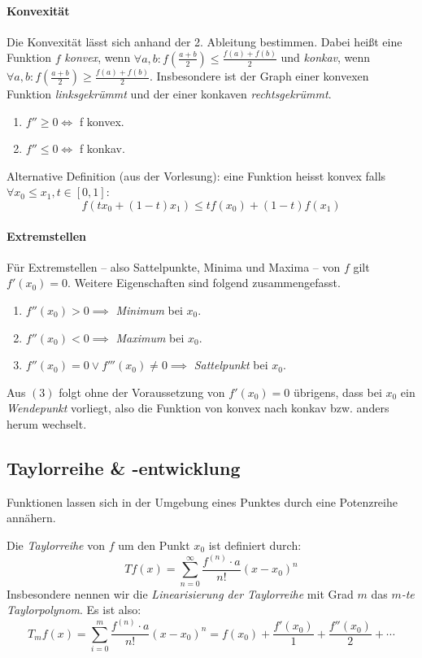 \documentclass[a4paper, 9pt, DIV=24]{scrartcl}
\begin{document}
\paragraph{Konvexität}
Die Konvexität lässt sich anhand der 2. Ableitung bestimmen.
Dabei heißt eine Funktion $f$ \emph{konvex}, wenn $\forall a,b: f(\frac{a+b}{2}) \leq \frac{f(a)+f(b)}{2}$
und \emph{konkav}, wenn $\forall a,b: f(\frac{a+b}{2}) \geq \frac{f(a)+f(b)}{2}$.
Insbesondere ist der Graph einer konvexen Funktion \emph{linksgekrümmt} und der einer konkaven \emph{rechtsgekrümmt}.
\begin{enumerate}[label={(}\arabic*{)}]
 \item $f'' \geq 0 \iff $ f konvex.
 \item $f'' \leq 0 \iff $ f konkav.
\end{enumerate}
Alternative Definition (aus der Vorlesung): eine Funktion heisst konvex falls $\forall x_0\leq x_1, t\in [0,1]$:
$$f(tx_0+(1-t)x_1)\leq tf(x_0)+(1-t)f(x_1)$$
\paragraph{Extremstellen}
Für Extremstellen -- also Sattelpunkte, Minima und Maxima -- von $f$ gilt $f'(x_0) = 0$.
Weitere Eigenschaften sind folgend zusammengefasst.
\begin{enumerate}[label={(}\arabic*{)}]
 \item $f''(x_0) > 0 \implies$ \emph{Minimum} bei $x_0$.
 \item $f''(x_0) < 0 \implies$ \emph{Maximum} bei $x_0$.
 \item $f''(x_0) = 0 \vee f'''(x_0) \neq 0 \implies$ \emph{Sattelpunkt} bei $x_0$.
\end{enumerate}

Aus $(3)$ folgt ohne der Voraussetzung von $f'(x_0) = 0$ übrigens, dass bei $x_0$ ein \emph{Wendepunkt} vorliegt,
also die Funktion von konvex nach konkav bzw. anders herum wechselt.

\subsection{Taylorreihe \& -entwicklung}
Funktionen lassen sich in der Umgebung eines Punktes durch eine Potenzreihe annähern.

Die \emph{Taylorreihe} von $f$ um den Punkt $x_0$ ist definiert durch:
\[ T f(x) = \sum_{n=0}^{\infty} \dfrac{f^{(n)}\cdot a}{n!}(x-x_0)^n \]
Insbesondere nennen wir die \emph{Linearisierung der Taylorreihe} mit Grad $m$ das \emph{$m$-te Taylorpolynom}.
Es ist also:
\[ T_m f(x) = \sum_{i=0}^{m} \dfrac{f^{(n)}\cdot a}{n!}(x-x_0)^n = f(x_0) + \dfrac{f'(x_0)}{1} + \dfrac{f''(x_0)}{2} + \cdots\]
\end{document}
